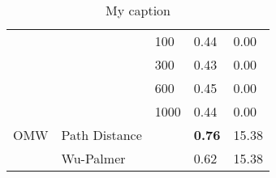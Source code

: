 \begin{table}[]
\begin{tabular}{@{}lllll@{}}
                 &               & 100  & 0.44             & 0.00                    \\
                 &               & 300  & 0.43             & 0.00                    \\
                 &               & 600  & 0.45             & 0.00                    \\
                 &               & 1000 & 0.44             & 0.00                    \\ \cmidrule(r){1-5}
OMW              & Path Distance &      & \textbf{0.76}    & 15.38                   \\
                 & Wu-Palmer     &      & 0.62             & 15.38                   \\ \cmidrule(r){1-5}
\end{tabular}
\caption{My caption}
\label{my-label}
\end{table}



     
     
     
     
     
     
     
      


